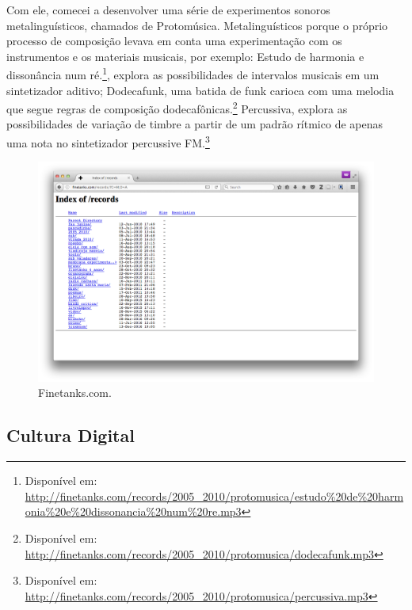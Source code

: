 Com ele, comecei a desenvolver uma série de experimentos sonoros metalinguísticos, chamados de Protomúsica. Metalinguísticos porque o próprio processo de composição levava em conta uma experimentação com os instrumentos e os materiais musicais, por exemplo:
Estudo de harmonia e dissonância num ré.\footnote{Disponível em: \url{http://finetanks.com/records/2005_2010/protomusica/estudo\%20de\%20harmonia\%20e\%20dissonancia\%20num\%20re.mp3}}, explora as possibilidades de intervalos musicais em um sintetizador aditivo;
Dodecafunk, uma batida de funk carioca com uma melodia que segue regras de composição dodecafônicas.\footnote{Disponível em: \url{http://finetanks.com/records/2005_2010/protomusica/dodecafunk.mp3}}
Percussiva, explora as possibilidades de variação de timbre a partir de um padrão rítmico de apenas uma nota no sintetizador percussive FM.\footnote{Disponível em: \url{http://finetanks.com/records/2005_2010/protomusica/percussiva.mp3}}



\begin{figure}

\includegraphics[width=1\textwidth]{pictures/cap1/finetanksrecords}
\caption{Finetanks.com.}
\label{fig:finetanks}
\end{figure}




\subsection{Cultura Digital}

